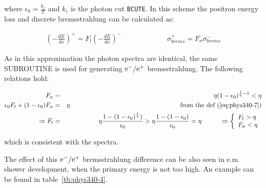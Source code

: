 where $\epsilon_{0} = \frac{k_c}{T}$ and $k_c$ is the photon
cut {\tt BCUTE}. In this scheme the positron energy loss and
discrete bremsstrahlung can be calculated as:

\begin{eqnarray*}
\left ( - \frac{dE}{dx} \right )^{+} = F_{l} 
\left ( - \frac{dE}{dx} \right )^{-} & \hspace{2cm} &
\sigma^{+}_{brems} = F_{\sigma} \sigma^{-}_{brems}
\end{eqnarray*}

As in this approximation the photon spectra are identical, the
same SUBROUTINE is used for generating $\mathrm{e}^-/\mathrm{e}^+$ bremsstrahlung.
The following relations hold:

\begin{eqnarray*}
F_{\sigma} & = & \eta (1-\epsilon_{0})^{\frac{1}{\eta}-1}
< \eta \\
\epsilon_{0} F_{l} + (1-\epsilon_{0}) F_{\sigma} & = & \eta
\hspace{6cm} \mbox{from the def (\ref{eq:phys340-7})} \\
\Rightarrow F_{l} & = & \eta \frac{1-(1-\epsilon_{0})^{\frac{1}
{\eta}})}{\epsilon_{0}} > \eta \frac{1-(1-\epsilon_{0})}
{\epsilon_{0}} = \eta  \hspace{1cm}
\Rightarrow   \left \{
\begin{array}{l}
F_{l} > \eta \\
F_{\sigma} < \eta
\end{array} \right .
\end{eqnarray*}

which is consistent with the spectra.

The effect of this $\mathrm{e}^-/\mathrm{e}^+$ bremsstrahlung difference can be also
seen in e.m. shower development, when the primary energy is not too
high. An example can be found in table~\ref{tb:phys340-4}.

